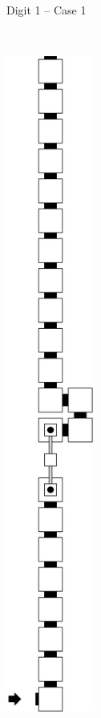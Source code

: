 \begin{itemize}
\begin{figure}[H]
\begin{subfigure}[t]{0.32\textwidth}
                \caption{\label{fig:post_warp_case1_digit1_msr} Digit 1 -- Case 1}
            \end{subfigure}%
            ~
            \begin{subfigure}[t]{0.32\textwidth}
                \centering
                \includegraphics[width=0.32\textwidth]{warping_post_warp_case2_digit1_msr}

\end{subfigure}
\end{figure}
\end{itemize}
